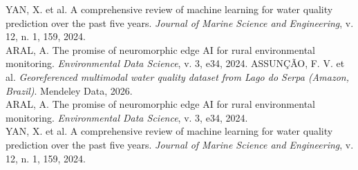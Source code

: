 \fontsize{20}{24}\selectfont
\ifPosterBlinded
YAN, X. et al. A comprehensive review of machine learning for water quality prediction over the past five years. \textit{Journal of Marine Science and Engineering}, v. 12, n. 1, 159, 2024.\\[0.25em]
ARAL, A. The promise of neuromorphic edge AI for rural environmental monitoring. \textit{Environmental Data Science}, v. 3, e34, 2024.
\else
ASSUNÇÃO, F. V. et al. \textit{Georeferenced multimodal water quality dataset from Lago do Serpa (Amazon, Brazil)}. Mendeley Data, 2026.\\[0.25em]
ARAL, A. The promise of neuromorphic edge AI for rural environmental monitoring. \textit{Environmental Data Science}, v. 3, e34, 2024.\\[0.25em]
YAN, X. et al. A comprehensive review of machine learning for water quality prediction over the past five years. \textit{Journal of Marine Science and Engineering}, v. 12, n. 1, 159, 2024.
\fi
